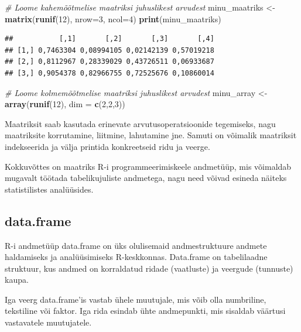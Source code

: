 \documentclass[
]{book}
\newenvironment{Shaded}{\begin{snugshade}}{\end{snugshade}}
\newcommand{\AttributeTok}[1]{\textcolor[rgb]{0.13,0.29,0.53}{#1}}
\newcommand{\CommentTok}[1]{\textcolor[rgb]{0.56,0.35,0.01}{\textit{#1}}}
\newcommand{\DecValTok}[1]{\textcolor[rgb]{0.00,0.00,0.81}{#1}}
\newcommand{\FunctionTok}[1]{\textcolor[rgb]{0.13,0.29,0.53}{\textbf{#1}}}
\newcommand{\NormalTok}[1]{#1}
\newcommand{\OtherTok}[1]{\textcolor[rgb]{0.56,0.35,0.01}{#1}}
\renewenvironment{Shaded} {\begin{snugshade}\footnotesize} {\end{snugshade}}
\begin{document}
\begin{Shaded}
\begin{Highlighting}[]
\CommentTok{\# Loome kahemõõtmelise maatriksi juhuslikest arvudest}
\NormalTok{minu\_maatriks }\OtherTok{\textless{}{-}} \FunctionTok{matrix}\NormalTok{(}\FunctionTok{runif}\NormalTok{(}\DecValTok{12}\NormalTok{), }\AttributeTok{nrow=}\DecValTok{3}\NormalTok{, }\AttributeTok{ncol=}\DecValTok{4}\NormalTok{)}
\FunctionTok{print}\NormalTok{(minu\_maatriks)}
\end{Highlighting}
\end{Shaded}

\begin{verbatim}
##           [,1]       [,2]       [,3]       [,4]
## [1,] 0,7463304 0,08994105 0,02142139 0,57019218
## [2,] 0,8112967 0,28339029 0,43726511 0,06933687
## [3,] 0,9054378 0,82966755 0,72525676 0,10860014
\end{verbatim}

\begin{Shaded}
\begin{Highlighting}[]
\CommentTok{\# Loome kolmemõõtmelise maatriksi juhuslikest arvudest}
\NormalTok{minu\_array }\OtherTok{\textless{}{-}} \FunctionTok{array}\NormalTok{(}\FunctionTok{runif}\NormalTok{(}\DecValTok{12}\NormalTok{), }\AttributeTok{dim =} \FunctionTok{c}\NormalTok{(}\DecValTok{2}\NormalTok{,}\DecValTok{2}\NormalTok{,}\DecValTok{3}\NormalTok{))}
\end{Highlighting}
\end{Shaded}

Maatriksit saab kasutada erinevate arvutusoperatsioonide tegemiseks, nagu maatriksite korrutamine, liitmine, lahutamine jne. Samuti on võimalik maatriksit indekseerida ja välja printida konkreetseid ridu ja veerge.

Kokkuvõttes on maatriks R-i programmeerimiskeele andmetüüp, mis võimaldab mugavalt töötada tabelikujuliste andmetega, nagu need võivad esineda näiteks statistilistes analüüsides.

\subsection{data.frame}\label{data.frame}

R-i andmetüüp data.frame on üks olulisemaid andmestruktuure andmete haldamiseks ja analüüsimiseks R-keskkonnas. Data.frame on tabelilaadne struktuur, kus andmed on korraldatud ridade (vaatluste) ja veergude (tunnuste) kaupa.

Iga veerg data.frame'is vastab ühele muutujale, mis võib olla numbriline, tekstiline või faktor. Iga rida esindab ühte andmepunkti, mis sisaldab väärtusi vastavatele muutujatele.
\end{document}
